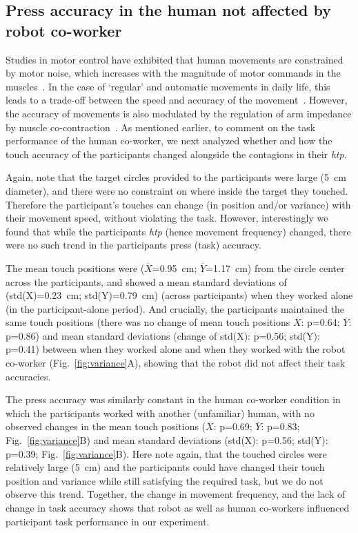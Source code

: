 \subsection{Press accuracy in the human not affected by robot co-worker}

Studies in motor control have exhibited that human movements are constrained by motor noise, which increases with the magnitude of motor commands in the muscles~\cite{Harris:Nature:1998}. In the case of `regular' and automatic movements in daily life, this leads to a trade-off between the speed and accuracy of the movement~\cite{Fitts:JEP:1954}. However, the accuracy of movements is also modulated by the regulation of arm impedance by muscle co-contraction~\cite{Burdet:nature:2001, Franklin:JoN:2008, Ganesh:RAS:2013}. As mentioned earlier, to comment on the task performance of the human co-worker, we next analyzed whether and how the touch accuracy of the participants changed alongside the contagions in their {\it htp}. 

Again, note that the target circles provided to the participants were large (5~cm diameter), and there were no constraint on where inside the target they touched. Therefore the participant's touches can change (in position and/or variance) with their movement speed, without violating the task. However, interestingly we found that while the participants {\it htp} (hence movement frequency) changed, there were no such trend in the participants press (task) accuracy. 

The mean touch positions were ($\overline{X}$=0.95~cm; $\overline{Y}$=1.17~cm) from the circle center across the participants, and showed a mean standard deviations of (std(X)=0.23~cm; std(Y)=0.79~cm) (across participants) when they worked alone (in the participant-alone period). And crucially, the participants maintained the same touch positions (there was no change of mean touch positions $\overline{X}$: p=0.64; $\overline{Y}$: p=0.86) and mean standard deviations (change of std(X): p=0.56; std(Y): p=0.41) between when they worked alone and when they worked with the robot co-worker (Fig.~\ref{fig:variance}A), showing that the robot did not affect their task accuracies.

The press accuracy was similarly constant in the human co-worker condition in which the participants worked with another (unfamiliar) human, with no observed changes in the mean touch positions ($\overline{X}$: p=0.69; $\overline{Y}$: p=0.83; Fig.~\ref{fig:variance}B) and mean standard deviations (std(X): p=0.56; std(Y): p=0.39; Fig.~\ref{fig:variance}B). Here note again, that the touched circles were relatively large (5~cm) and the participants could have changed their touch position and variance while still satisfying the required task, but we do not observe this trend. Together, the change in movement frequency, and the lack of change in task accuracy shows that robot as well as human co-workers influenced participant task performance in our experiment.


